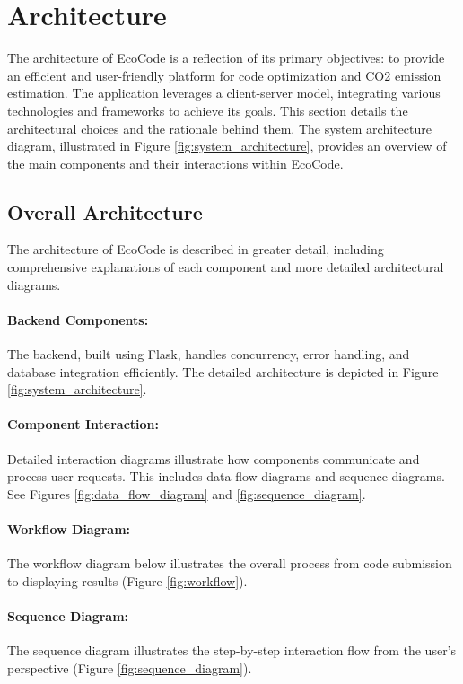 \documentclass[conference,compsoc]{IEEEtran}
\begin{document}
\section{Architecture}
The architecture of EcoCode is a reflection of its primary objectives: to provide an efficient and user-friendly platform for  code optimization and CO2 emission estimation. The application leverages a client-server model, integrating various technologies and frameworks to achieve its goals. This section details the architectural choices and the rationale behind them. The system architecture diagram, illustrated in Figure \ref{fig:system_architecture}, provides an overview of the main components and their interactions within EcoCode.

\subsection{Overall Architecture}
\label{sec:architecture_presentation}

The architecture of EcoCode is described in greater detail, including comprehensive explanations of each component and more detailed architectural diagrams.

\paragraph{Backend Components:}
The backend, built using Flask, handles concurrency, error handling, and database integration efficiently. The detailed architecture is depicted in Figure \ref{fig:system_architecture}.

\paragraph{Component Interaction:}
Detailed interaction diagrams illustrate how components communicate and process user requests. This includes data flow diagrams and sequence diagrams. See Figures \ref{fig:data_flow_diagram} and \ref{fig:sequence_diagram}.

\paragraph{Workflow Diagram:}
The workflow diagram below illustrates the overall process from code submission to displaying results (Figure \ref{fig:workflow}).

\paragraph{Sequence Diagram:}
The sequence diagram illustrates the step-by-step interaction flow from the user's perspective (Figure \ref{fig:sequence_diagram}).
\end{document}
